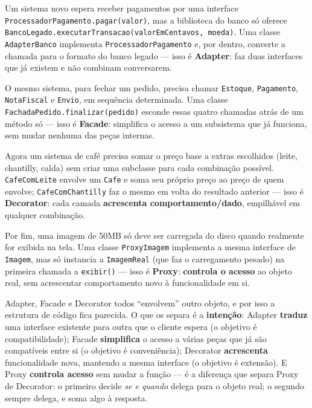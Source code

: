 \begin{exemplo}
Um sistema novo espera receber pagamentos por uma interface
\texttt{ProcessadorPagamento.pagar(valor)}, mas a biblioteca do banco só
oferece \texttt{BancoLegado.executarTransacao(valorEmCentavos, moeda)}.
Uma classe \texttt{AdapterBanco} implementa \texttt{ProcessadorPagamento} e,
por dentro, converte a chamada para o formato do banco legado --- isso é
\textbf{Adapter}: faz duas interfaces que já existem e não combinam
conversarem.

O mesmo sistema, para fechar um pedido, precisa chamar \texttt{Estoque},
\texttt{Pagamento}, \texttt{NotaFiscal} e \texttt{Envio}, em sequência
determinada. Uma classe \texttt{FachadaPedido.finalizar(pedido)} esconde
essas quatro chamadas atrás de um método só --- isso é \textbf{Facade}:
simplifica o acesso a um subsistema que já funciona, sem mudar nenhuma das
peças internas.

Agora um sistema de café precisa somar o preço base a extras escolhidos
(leite, chantilly, calda) sem criar uma subclasse para cada combinação
possível. \texttt{CafeComLeite} envolve um \texttt{Cafe} e soma seu próprio
preço ao preço de quem envolve; \texttt{CafeComChantilly} faz o mesmo em
volta do resultado anterior --- isso é \textbf{Decorator}: cada camada
\textbf{acrescenta comportamento/dado}, empilhável em qualquer combinação.

Por fim, uma imagem de 50MB só deve ser carregada do disco quando
realmente for exibida na tela. Uma classe \texttt{ProxyImagem} implementa a
mesma interface de \texttt{Imagem}, mas só instancia a \texttt{ImagemReal}
(que faz o carregamento pesado) na primeira chamada a \texttt{exibir()}
--- isso é \textbf{Proxy}: \textbf{controla o acesso} ao objeto real, sem
acrescentar comportamento novo à funcionalidade em si.
\end{exemplo}

\begin{cuidado}
Adapter, Facade e Decorator todos “envolvem” outro objeto, e por isso a
estrutura de código fica parecida. O que os separa é a \textbf{intenção}:
Adapter \textbf{traduz} uma interface existente para outra que o cliente
espera (o objetivo é compatibilidade); Facade \textbf{simplifica} o acesso
a várias peças que já são compatíveis entre si (o objetivo é conveniência);
Decorator \textbf{acrescenta} funcionalidade nova, mantendo a mesma
interface (o objetivo é extensão). E Proxy \textbf{controla acesso} sem
mudar a função --- é a diferença que separa Proxy de Decorator: o primeiro
decide \textit{se e quando} delega para o objeto real; o segundo sempre
delega, e soma algo à resposta.
\end{cuidado}

